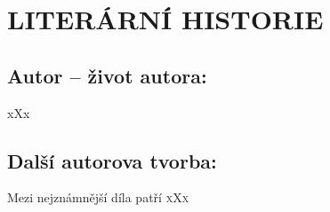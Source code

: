 \documentclass[A4paper]{extarticle} %
\begin{document}
\section*{LITERÁRNÍ HISTORIE}





\subsection*{Autor {\ssmall -- život autora:}}
\noindent 
xXx


\subsection*{Další autorova tvorba:}
\noindent 
Mezi nejznámnější díla patří \textsc{xXx}



\end{document}
